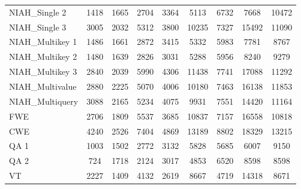 \begin{table}[t]
{\begin{tabular}{l|c|c|c|c|c|c|c|c}
NIAH\_Single 2 & 1418 & 1665 & 2704 & 3364 & 5113 & 6732 & 7668 & 10472 \\
NIAH\_Single 3 & 3005 & 2032 & 5312 & 3800 & 10235 & 7327 & 15492 & 11090 \\
NIAH\_Multikey 1 & 1486 & 1661 & 2872 & 3415 & 5332 & 5983 & 7781 & 8767 \\
NIAH\_Multikey 2 & 1480 & 1639 & 2826 & 3031 & 5288 & 5956 & 8240 & 9279 \\
NIAH\_Multikey 3 & 2840 & 2039 & 5990 & 4306 & 11438 & 7741 & 17088 & 11292 \\
NIAH\_Multivalue & 2880 & 2225 & 5070 & 4006 & 10180 & 7463 & 16138 & 11853 \\
NIAH\_Multiquery & 3088 & 2165 & 5234 & 4075 & 9931 & 7551 & 14420 & 11164 \\
FWE & 2706 & 1809 & 5537 & 3685 & 10837 & 7157 & 16558 & 10818 \\
CWE & 4240 & 2526 & 7404 & 4869 & 13189 & 8802 & 18329 & 13215 \\
QA 1 & 1003 & 1502 & 2772 & 3132 & 5828 & 5685 & 6007 & 9150 \\
QA 2 & 724 & 1718 & 2124 & 3017 & 4853 & 6520 & 8598 & 8598 \\
VT & 2227 & 1409 & 4132 & 2619 & 8667 & 4719 & 14318 & 8671 \\
\hline

\end{tabular}
}

\label{tab:ruler-token-count}
\end{table}
